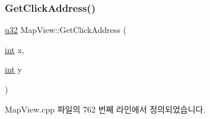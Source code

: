 \subsubsection{\texorpdfstring{Get\+Click\+Address()}{GetClickAddress()}}
{\footnotesize\ttfamily \mbox{\hyperlink{_system_8h_a10e94b422ef0c20dcdec20d31a1f5049}{u32}} Map\+View\+::\+Get\+Click\+Address (\begin{DoxyParamCaption}\item[{\mbox{\hyperlink{_util_8cpp_a0ef32aa8672df19503a49fab2d0c8071}{int}}}]{x,  }\item[{\mbox{\hyperlink{_util_8cpp_a0ef32aa8672df19503a49fab2d0c8071}{int}}}]{y }\end{DoxyParamCaption})}



Map\+View.\+cpp 파일의 762 번째 라인에서 정의되었습니다.


